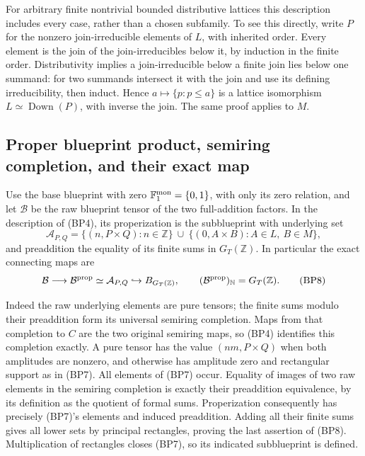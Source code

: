 For arbitrary finite nontrivial bounded distributive lattices this
description includes every case, rather than a chosen subfamily.
To see this directly, write $P$ for the nonzero join-irreducible
elements of $L$, with inherited order. Every element is the join
of the join-irreducibles below it, by induction in the finite order.
Distributivity implies a join-irreducible below a finite join lies
below one summand: for two summands intersect it with the join and
use its defining irreducibility, then induct. Hence
$a\mapsto\{p:p\le a\}$ is a lattice isomorphism
$L\simeq\operatorname{Down}(P)$, with inverse the join.
The same proof applies to $M$.

\subsection{Proper blueprint product, semiring completion, and their exact map}

Use the base blueprint with zero $\mathbb F_1^{\rm mon}=\{0,1\}$,
with only its zero relation, and let $\mathcal B$ be the raw
blueprint tensor of the two full-addition factors. In the description
of (BP4), its properization is the subblueprint with underlying set
\[
 \mathcal A_{P,Q}
 =\{(n,P\times Q):n\in\mathbb Z\}
       \ \cup\ \{(0,A\times B):A\in L,\ B\in M\},
 \tag{BP7}
\]
and preaddition the equality of its finite sums in $G_T(\mathbb Z)$.
In particular the exact connecting maps are
\[
 \mathcal B\longrightarrow\mathcal B^{\rm prop}
   \simeq\mathcal A_{P,Q}\hookrightarrow B_{G_T(\mathbb Z)},
 \qquad (\mathcal B^{\rm prop})_{\mathbb N}=G_T(\mathbb Z).
 \tag{BP8}
\]

Indeed the raw underlying elements are pure tensors; the finite sums
modulo their preaddition form its universal semiring completion.
Maps from that completion to $C$ are the two original semiring maps,
so (BP4) identifies this completion exactly. A pure tensor has the
value $(nm,P\times Q)$ when both amplitudes are nonzero, and otherwise
has amplitude zero and rectangular support as in (BP7). All elements
of (BP7) occur. Equality of images of two raw elements in the semiring
completion is exactly their preaddition equivalence, by its definition
as the quotient of formal sums. Properization consequently has
precisely (BP7)'s elements and induced preaddition. Adding all their
finite sums gives all lower sets by principal rectangles, proving
the last assertion of (BP8). Multiplication of rectangles closes
(BP7), so its indicated subblueprint is defined.

